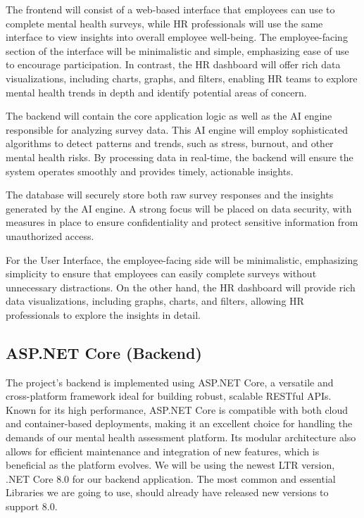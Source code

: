 \documentclass[conference]{IEEEtran}
\begin{document}
        The frontend will consist of a web-based interface that
        employees can use to complete mental health surveys, while
        HR professionals will use the same interface to view insights
        into overall employee well-being. The employee-facing
        section of the interface will be minimalistic and simple,
        emphasizing ease of use to encourage participation. In
        contrast, the HR dashboard will offer rich data visualizations,
        including charts, graphs, and filters, enabling HR teams to
        explore mental health trends in depth and identify potential
        areas of concern.\newline
        
        The backend will contain the core application logic as well
        as the AI engine responsible for analyzing survey data. This
        AI engine will employ sophisticated algorithms to detect
        patterns and trends, such as stress, burnout, and other mental
        health risks. By processing data in real-time, the backend will
        ensure the system operates smoothly and provides timely,
        actionable insights.\newline
        
        The database will securely store both raw survey responses
        and the insights generated by the AI engine. A strong focus
        will be placed on data security, with measures in place to
        ensure confidentiality and protect sensitive information from
        unauthorized access.\newline
        
        For the User Interface, the employee-facing side will be
        minimalistic, emphasizing simplicity to ensure that employees
        can easily complete surveys without unnecessary distractions.
        On the other hand, the HR dashboard will provide rich data
        visualizations, including graphs, charts, and filters, allowing
        HR professionals to explore the insights in detail.
        \newline
    
        \subsection {ASP.NET Core (Backend)}


            The project’s backend is implemented using ASP.NET Core, 
            a versatile and cross-platform framework ideal for building 
            robust, scalable RESTful APIs. Known for its high performance, ASP.NET Core is compatible with both cloud and container-based deployments, making it an excellent choice for handling the demands of our mental health assessment platform. Its modular architecture also allows for efficient maintenance and integration of new features, which is beneficial as the platform evolves. We will be using the newest LTR version, .NET Core 8.0 for our backend application. The most common and essential Libraries we are going to use, should already have released new versions to support 8.0.
            \newline
\end{document}
